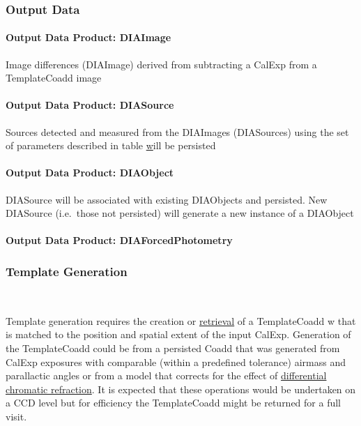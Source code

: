 \subsubsection{Output Data}

\paragraph{Output Data Product: DIAImage}

Image differences (DIAImage) derived from subtracting a CalExp from a TemplateCoadd image 

\paragraph{Output Data Product: DIASource}

Sources detected and measured from the DIAImages (DIASources) using the set of parameters described in table \hyperref[table:ap_features] will be persisted


\paragraph{Output Data Product: DIAObject}

DIASource will be associated with existing DIAObjects and persisted. New DIASource (i.e.\ those not persisted) will generate a new instance of a DIAObject 

\paragraph{Output Data Product: DIAForcedPhotometry}




\subsubsection{Template Generation}~
\label{sec:apCRTemplates}

Template generation requires the creation or \hyperref[sec:acRetrieveTemplate]{retrieval} of a TemplateCoadd w that is matched to the position and spatial extent of the input CalExp. Generation of the TemplateCoadd could be from a persisted Coadd that was generated from CalExp exposures with comparable (within a predefined tolerance) airmass and parallactic angles or from a model that corrects for the effect of  \hyperref[sec:acDCRTemplates]{differential chromatic refraction}. It is expected that these operations would be undertaken on a CCD level but for efficiency the TemplateCoadd might be returned for a full visit. 


